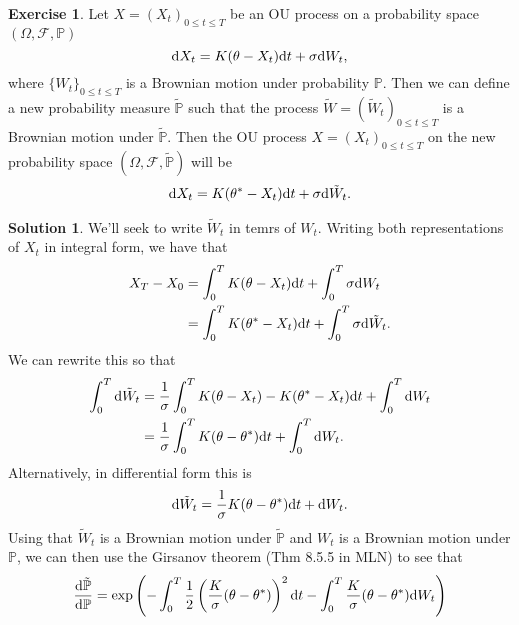 \documentclass[12pt]{article}
\newcommand{\Prob}{\mathbb{P}}
\newcommand{\calF}{\mathcal{F}}
\theoremstyle{definition}
\newtheorem{exer}{Exercise}
\newtheorem{sol}{Solution}
\theoremstyle{remark}
\def\d{{\rm d}}
\begin{document}
\newpage

\begin{exer}
    Let $X = (X_{t})_{0\leq t\leq T}$ be an OU process on a probability space $(\Omega, \calF, \Prob)$
    \begin{equation*}
        \d X_{t} = K(\theta - X_{t}) \d t + \sigma \d W_{t},
    \end{equation*}
where $\{ W_{t} \}_{ 0\leq t \leq T}$ is a Brownian motion under probability $\Prob$. Then we can define a new probability measure $\tilde{\Prob}$ such that the process  $\tilde{W} = (\tilde{W}_{t})_{0\leq t \leq T}$ is a Brownian motion under $\tilde{\Prob}$. Then the OU process  $X  = (X_{t})_{0\leq t \leq T}$ on the new probability space $(\Omega, \calF, \tilde{\Prob})$ will be 
    \begin{align*}
        \d X_{t} = K(\theta^{*} - X_{t}) \d t   + \sigma \d \tilde{W}_{t}.
    \end{align*}
\end{exer}

\begin{sol}
    We'll seek to write $\tilde{W}_{t}$ in temrs of $W_{t}$. Writing both representations of $X_{t}$ in integral form, we have that
    \begin{align*}
        X_{T} - X_{0} &= \int_{0}^{T} K(\theta - X_{t}) \d t + \int_{0}^{T} \sigma \d W_{t}\\ 
                      &= \int_{0}^{T} K(\theta^{*} - X_{t}) \d t + \int_{0}^{T} \sigma \d \tilde{W}_{t}.
    \end{align*}
    We can rewrite this so that
    \begin{align*}
        \int_{0}^{T} \d \tilde{W}_{t} &= \frac{1}{\sigma}\int_{0}^{T} K(\theta - X_{t}) - K(\theta^{*} - X_{t}) \d t + \int_{0}^{T} \d W_{t}\\
                                      &= \frac{1}{\sigma} \int_{0}^{T} K (\theta - \theta^{*})\d t + \int_{0}^{T} \d W_{t}.
    \end{align*}
    Alternatively, in differential form this is
    \begin{equation*}
        \d \tilde{W}_{t} = \frac{1}{\sigma}  K (\theta - \theta^{*})\d t + \d W_{t}.
    \end{equation*}
    Using that $\tilde{W}_{t}$ is a Brownian motion under $\tilde{\Prob}$ and $W_{t}$ is a Brownian motion under $\Prob$, we can then use the Girsanov theorem (Thm 8.5.5 in MLN) to see that 
    \begin{equation*}
        \frac{\d\tilde{\Prob}}{\d \Prob} = \exp\left( - \int_{0}^{T} \frac{1}{2} \left( \frac{K}{\sigma}  (\theta - \theta^{*})  \right )^{2} \d t -  \int_{0}^{T} \frac{K}{\sigma}  (\theta - \theta^{*}) \d W_{t} \right)
    \end{equation*}
\end{sol}
\end{document}
